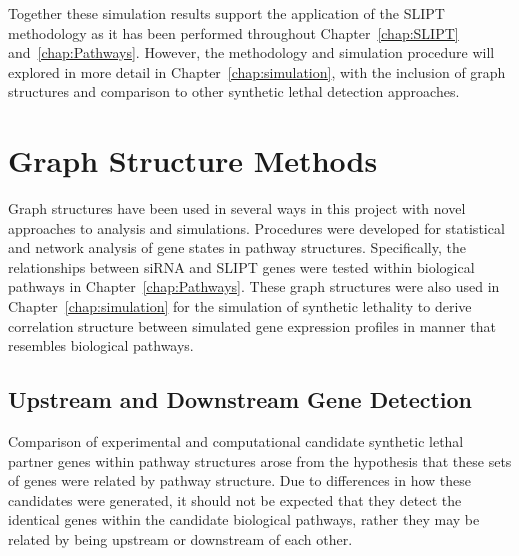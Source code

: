 Together these simulation results support the application of the \gls{SLIPT} methodology as it has been performed throughout Chapter~\ref{chap:SLIPT} and~\ref{chap:Pathways}. However, the methodology and simulation procedure will explored in more detail in Chapter~\ref{chap:simulation}, with the inclusion of graph structures and comparison to other synthetic lethal detection approaches.

\FloatBarrier

\section{Graph Structure Methods}
Graph structures have been used in several ways in this project with novel approaches to analysis and simulations. Procedures were developed for statistical and network analysis of gene states in pathway structures. Specifically, the relationships between \gls{siRNA} and \gls{SLIPT} genes were tested within biological pathways in Chapter~\ref{chap:Pathways}. These graph structures were also used in Chapter~\ref{chap:simulation} for the simulation of synthetic lethality to derive correlation structure between simulated gene expression profiles in manner that resembles biological pathways.


\subsection{Upstream and Downstream Gene Detection} \label{methods:pathway_str} 
Comparison of experimental and computational candidate synthetic lethal partner genes within pathway structures arose from the hypothesis that these sets of genes were related by pathway structure. Due to differences in how these candidates were generated, it should not be expected that they detect the identical genes within the candidate biological pathways, rather they may be related by being upstream or downstream of each other. 

